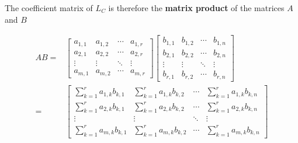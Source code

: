 \documentclass{article}
\begin{document}
The coefficient matrix of \(L_C\) is therefore the {\bf matrix product} of the matrices \(A\) and \(B\) 

\begin{align*}
AB = & \begin{bmatrix} 
a_{1,1} & a_{1,2} & \cdots & a_{1,r} \\
a_{2,1} & a_{2,2} & \cdots & a_{2,r} \\
\vdots & \vdots & \ddots & \vdots \\
a_{m,1} & a_{m,2} & \cdots & a_{m,r} 
\end{bmatrix}\begin{bmatrix} 
b_{1,1} & b_{1,2} & \cdots & b_{1,n} \\
b_{2,1} & b_{2,2} & \cdots & b_{2,n} \\
\vdots & \vdots & \ddots & \vdots \\
b_{r,1} & b_{r,2} & \cdots & b_{r,n} 
\end{bmatrix} \\
= & \begin{bmatrix}
\sum_{k=1}^r a_{1,k} b_{k,1} & \sum_{k=1}^r a_{1,k} b_{k,2} & \cdots & \sum_{k=1}^r a_{1,k} b_{k,n} \\ 
\sum_{k=1}^r a_{2,k} b_{k,1} & \sum_{k=1}^r a_{2,k} b_{k,2} & \cdots & \sum_{k=1}^r a_{2,k} b_{k,n} \\ 
\vdots & \vdots & \ddots & \vdots \\
\sum_{k=1}^r a_{m,k} b_{k,1} & \sum_{k=1}^r a_{m,k} b_{k,2} & \cdots & \sum_{k=1}^r a_{m,k} b_{k,n}
\end{bmatrix}
\end{align*}
\end{document}

